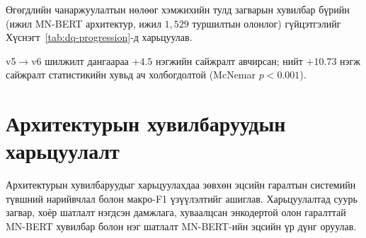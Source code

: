 Өгөгдлийн чанаржуулалтын нөлөөг хэмжихийн тулд загварын хувилбар бүрийн
(ижил MN-BERT архитектур, ижил $1{,}529$ туршилтын олонлог) гүйцэтгэлийг
Хүснэгт~\ref{tab:dq-progression}-д харьцуулав.

\begin{table}[H]
\centering
\caption{Өгөгдлийн чанаржуулалтын явц дахь туршилтын гүйцэтгэл}
\label{tab:dq-progression}
\end{table}

v5$\to$v6 шилжилт дангаараа $+4.5$ нэгжийн сайжралт авчирсан; нийт $+10.73$ нэгж сайжралт статистикийн хувьд ач холбогдолтой (McNemar $p<0.001$).

\section{Архитектурын хувилбаруудын харьцуулалт}
\label{sec:comparison}

Архитектурын хувилбаруудыг харьцуулахдаа зөвхөн эцсийн гаралтын системийн
түвшний нарийвчлал болон макро-F1 үзүүлэлтийг ашиглав. Харьцуулалтад
суурь загвар, хоёр шатлалт нэгдсэн дамжлага, хуваалцсан энкодертой олон
гаралттай MN-BERT хувилбар болон нэг шатлалт MN-BERT-ийн эцсийн үр дүнг
оруулав.

